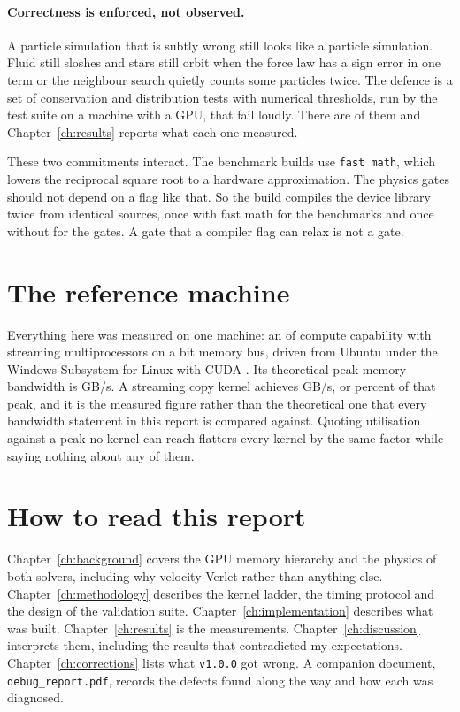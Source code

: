 \paragraph{Correctness is enforced, not observed.} A particle simulation that
is subtly wrong still looks like a particle simulation. Fluid still sloshes and
stars still orbit when the force law has a sign error in one term or the
neighbour search quietly counts some particles twice. The defence is a set of
conservation and distribution tests with numerical thresholds, run by the test suite on
a machine with a GPU, that fail loudly. There are \GateCount{} of them and
Chapter~\ref{ch:results} reports what each one measured.

These two commitments interact. The benchmark builds use \texttt{fast math},
which lowers the reciprocal square root to a hardware approximation. The physics gates
should not depend on a flag like that. So the build compiles the device library twice from
identical sources, once with fast math for the benchmarks and once without for
the gates. A gate that a compiler flag can relax is not a gate.

\section{The reference machine}

Everything here was measured on one machine: an \GpuName{} of compute
capability \GpuCompute{} with \GpuSms{} streaming multiprocessors on a
\GpuBusBits{} bit memory bus, driven from Ubuntu under the Windows Subsystem
for Linux with CUDA \CudaRuntime{}. Its theoretical peak memory bandwidth is
\GpuPeakBandwidth{} GB/s. A streaming copy kernel achieves
\GpuMeasuredBandwidth{} GB/s, or \GpuBandwidthEfficiency{} percent of that
peak, and it is the measured figure rather than the theoretical one that every
bandwidth statement in this report is compared against. Quoting utilisation
against a peak no kernel can reach flatters every kernel by the same factor
while saying nothing about any of them.

\section{How to read this report}

Chapter~\ref{ch:background} covers the GPU memory hierarchy and the physics of
both solvers, including why velocity Verlet rather than anything else.
Chapter~\ref{ch:methodology} describes the kernel ladder, the timing protocol
and the design of the validation suite. Chapter~\ref{ch:implementation}
describes what was built. Chapter~\ref{ch:results} is the measurements.
Chapter~\ref{ch:discussion} interprets them, including the results that
contradicted my expectations. Chapter~\ref{ch:corrections} lists what
\texttt{v1.0.0} got wrong. A companion document,
\texttt{debug\_report.pdf}, records the defects found along the way and how
each was diagnosed.
